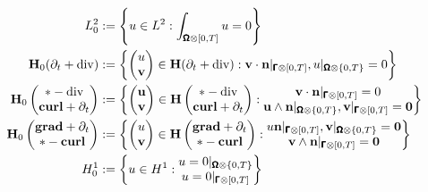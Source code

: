             \begin{align}
                L^{2}_{0}  &:=  \left\{u \in L^{2} : \int_{\pmb{\mathsf{\Omega}}\otimes[0, T]}u = 0\right\}  \\
                \mathbf{H}_{0}(\partial_{t} + \mathrm{div})  &:=  \left\{\begin{pmatrix} u \\ \mathbf{v} \end{pmatrix} \in \mathbf{H}(\partial_{t} + \mathrm{div}) : \mathbf{v}\cdot\mathbf{n}|_{\pmb{\mathsf{\Gamma}}\otimes[0, T]}, u|_{\pmb{\mathsf{\Omega}}\otimes\{0, T\}} = 0\right\}  \\
                \mathbf{H}_{0}\left(\begin{matrix} * - \mathrm{div} \\ \mathbf{curl} + \partial_{t} \end{matrix}\right)  &:=  \left\{\begin{pmatrix} \mathbf{u} \\ \mathbf{v} \end{pmatrix} \in \mathbf{H}\left(\begin{matrix} * - \mathrm{div} \\ \mathbf{curl} + \partial_{t} \end{matrix}\right) : \begin{matrix} \mathbf{v}\cdot\mathbf{n}|_{\pmb{\mathsf{\Gamma}}\otimes[0, T]} = 0 \\ \mathbf{u}\wedge\mathbf{n}|_{\pmb{\mathsf{\Omega}}\otimes\{0, T\}}, \mathbf{v}|_{\pmb{\mathsf{\Gamma}}\otimes[0, T]} = \mathbf{0} \end{matrix}\right\}  \\
                \mathbf{H}_{0}\left(\begin{matrix} \mathbf{grad} + \partial_{t} \\ * - \mathbf{curl} \end{matrix}\right)  &:=  \left\{\begin{pmatrix} u \\ \mathbf{v} \end{pmatrix} \in \mathbf{H}\left(\begin{matrix} \mathbf{grad} + \partial_{t} \\ * - \mathbf{curl} \end{matrix}\right) : \begin{matrix} u\mathbf{n}|_{\pmb{\mathsf{\Gamma}}\otimes[0, T]}, \mathbf{v}|_{\pmb{\mathsf{\Omega}}\otimes\{0, T\}} = \mathbf{0} \\ \mathbf{v}\wedge\mathbf{n}|_{\pmb{\mathsf{\Gamma}}\otimes[0, T]} = \mathbf{0} \end{matrix}\right\}  \\
                H^{1}_{0}  &:=  \left\{u \in H^{1} : \begin{matrix} u = 0|_{\pmb{\mathsf{\Omega}}\otimes\{0, T\}} \\ u = 0|_{\pmb{\mathsf{\Gamma}}\otimes[0, T]} \end{matrix}\right\}
            \end{align}
